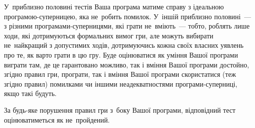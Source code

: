 \Scoring

У~приблизно половині тестів Ваша програма матиме справу з ідеальною програмою-суперницею, яка не~робить помилок.
У~іншій приблизно половині~--- з різними програмами-суперницями, які грати не~вміють~--- тобто, роблять лише ходи, які дотримуються формальних вимог гри, 
але можуть вибирати не~найкращий з допустимих ходів, дотримуючись кожна своїх власних уявлень про те, як варто грати в цю гру.
Буде оцінюватися 
як уміння Вашої програми виграти там, де це гарантовано можливо,
так і вміння Вашої програми достойно, згідно правил гри, програти, 
так і вміння Вашої програми скористатися (теж згідно правил) помилками чи іншими неадекватностями програми-суперниці, якщо такі будуть.

За будь-яке порушення правил гри з~боку Вашої програми, відповідний тест оцінюватиметься як не~пройдений.



\Examples

